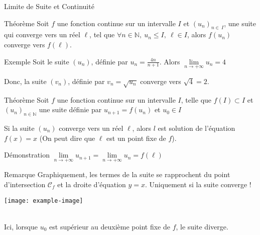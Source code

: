 \documentclass{cours}
\begin{document}
    \begin{Gpartie}{Limite de Suite et Continuité} 
        \begin{Spartie}{Théorème} 
            Soit $f$ une fonction continue sur un intervalle $I$ et $(u_n)_{n\in\ I}$, une suite qui converge vers un réel $\ell$, tel que $\forall n\in\mathbb{N},\ u_n\leq I,~\ell\in I$, alors $f(u_n)$ converge vers $f(\ell)$.
            \begin{SSpartie}{Exemple} 
                Soit le suite $(u_n)$, définie par $u_n=\frac{4n}{n+1}$. Alors $\lim\limits_{n\to +\infty}u_n=4$
                
                Donc, la suite $(v_n)$, définie par $v_n=\sqrt{u_n}$ converge vers $\sqrt{4}=2$.
            \end{SSpartie}
        \end{Spartie}
        \begin{Spartie}{Théorème}
            Soit $f$ une fonction continue sur un intervalle $I$, telle que $f(I)\subset I$ et $(u_n)_{n\in\mathbb{N}}$ une suite définie par $u_{n+1}=f(u_n)$ et $u_0\in I$
            
            Si la suite $(u_n)$ converge vers un réel $\ell$, alors $l$ est solution de l'équation $f(x)=x$ (On peut dire que $\ell$ est un point fixe de $f$).
            \begin{SSpartie}{Démonstration} 
                $\lim\limits_{n\to +\infty}u_{n+1}=\lim\limits_{n\to +\infty}u_n=f(\ell)$
            \end{SSpartie}
            \begin{SSpartie}{Remarque} 
                Graphiquement, les termes de la suite se rapprochent du point d'intersection $\mathcal{C}_f$ et la droite d'équation $y=x$. Uniquement si la suite converge !
                \begin{center}
                        \texttt{[image: example-image]}
                    \parbox{\linewidth}{} \\[2ex]
                    Ici, lorsque $u_0$ est supérieur au deuxième point fixe de $f$, le suite diverge.
                \end{center}
            \end{SSpartie}
        \end{Spartie}
    \end{Gpartie}
\end{document}

